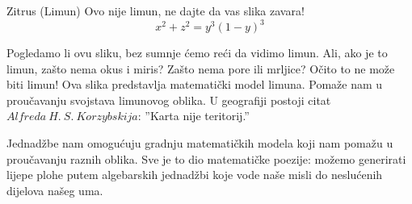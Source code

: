 \begin{surferPage}{Zitrus (Limun)}
Ovo nije limun, ne dajte da vas slika zavara!\\
\smallskip
\[x^2 + z^2 = y^3 (1 - y)^3\] 


\singlespacing
Pogledamo li ovu sliku, bez sumnje \'{c}emo re\'{c}i da vidimo limun. Ali, ako je to limun, za\v{s}to nema okus i miris? Za\v{s}to nema pore ili mrljice? O\v{c}ito to ne mo\v{z}e biti limun!
\singlespacing
Ova slika predstavlja matemati\v{c}ki model limuna. Poma\v{z}e nam u prou\v{c}avanju svojstava limunovog oblika. U geografiji postoji citat $Alfreda\ H.\ S.\ Korzybskija$: ''Karta nije teritorij.''\\
\singlespacing

Jednad\v{z}be nam omogu\'{c}uju gradnju matemati\v{c}kih modela koji nam poma\v{z}u u prou\v{c}avanju raznih oblika.
\singlespacing
Sve je to dio matemati\v{c}ke poezije: mo\v{z}emo generirati lijepe plohe putem algebarskih jednad\v{z}bi koje vode na\v{s}e misli do neslu\'{c}enih dijelova na\v{s}eg uma.
\end{surferPage}
